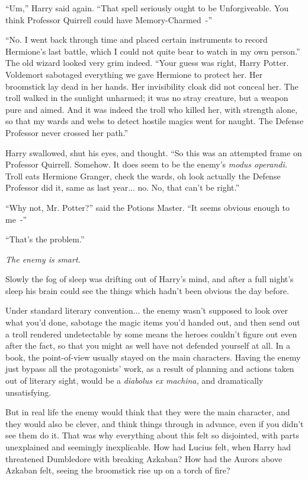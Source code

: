 ``Um,'' Harry said again. ``That spell seriously ought to be Unforgiveable. You think Professor Quirrell could have Memory-Charmed~-''

``No. I went back through time and placed certain instruments to record Hermione's last battle, which I could not quite bear to watch in my own person.'' The old wizard looked very grim indeed. ``Your guess was right, Harry Potter. Voldemort sabotaged everything we gave Hermione to protect her. Her broomstick lay dead in her hands. Her invisibility cloak did not conceal her. The troll walked in the sunlight unharmed; it was no stray creature, but a weapon pure and aimed. And it was indeed the troll who killed her, with strength alone, so that my wards and webs to detect hostile magics went for naught. The Defense Professor never crossed her path.''

Harry swallowed, shut his eyes, and thought. ``So this was an attempted frame on Professor Quirrell. Somehow. It does seem to be the enemy's \emph{modus operandi.} Troll eats Hermione Granger, check the wards, oh look actually the Defense Professor did it, same as last year... no. No, that can't be right.''

``Why not, Mr. Potter?'' said the Potions Master. ``It seems obvious enough to me~-''

``That's the problem.''

\emph{The enemy is smart.}

Slowly the fog of sleep was drifting out of Harry's mind, and after a full night's sleep his brain could see the things which hadn't been obvious the day before.

Under standard literary convention... the enemy wasn't supposed to look over what you'd done, sabotage the magic items you'd handed out, and then send out a troll rendered undetectable by some means the heroes couldn't figure out even after the fact, so that you might as well have not defended yourself at all. In a book, the point-of-view usually stayed on the main characters. Having the enemy just bypass all the protagonists' work, as a result of planning and actions taken out of literary sight, would be a \emph{diabolus ex machina,} and dramatically unsatisfying.

But in real life the enemy would think that they were the main character, and they would also be clever, and think things through in advance, even if you didn't see them do it. That was why everything about this felt so disjointed, with parts unexplained and seemingly inexplicable. How had Lucius felt, when Harry had threatened Dumbledore with breaking Azkaban? How had the Aurors above Azkaban felt, seeing the broomstick rise up on a torch of fire?

